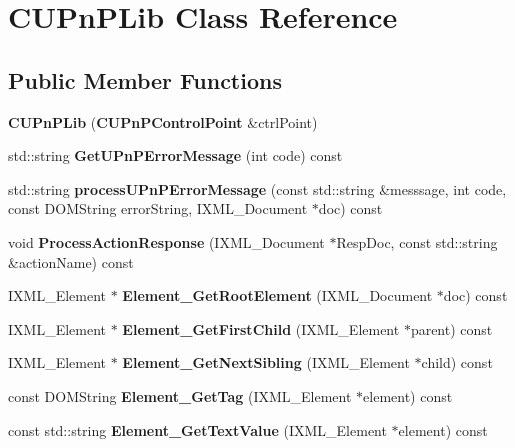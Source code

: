 \section{CUPnPLib Class Reference}
\label{classCUPnPLib}
\subsection*{Public Member Functions}
\begin{DoxyCompactItemize}
\item 
{\bfseries CUPnPLib} ({\bf CUPnPControlPoint} \&ctrlPoint)\label{classCUPnPLib_ae8731a033bfd07fde49535aad93a416f}

\item 
std::string {\bfseries GetUPnPErrorMessage} (int code) const \label{classCUPnPLib_a8d4ed7e4b65386f0cc9bb4f51164b68b}

\item 
std::string {\bfseries processUPnPErrorMessage} (const std::string \&messsage, int code, const DOMString errorString, IXML\_\-Document $\ast$doc) const \label{classCUPnPLib_a397a911f4fbdbf6155172938c4471d78}

\item 
void {\bfseries ProcessActionResponse} (IXML\_\-Document $\ast$RespDoc, const std::string \&actionName) const \label{classCUPnPLib_ad24e6d2abc21a5c380d834df67bb14ec}

\item 
IXML\_\-Element $\ast$ {\bfseries Element\_\-GetRootElement} (IXML\_\-Document $\ast$doc) const \label{classCUPnPLib_a6dd984ae2ef74898167311fbddf3afd6}

\item 
IXML\_\-Element $\ast$ {\bfseries Element\_\-GetFirstChild} (IXML\_\-Element $\ast$parent) const \label{classCUPnPLib_a23144e605ed9e30e6088dd6e6a136380}

\item 
IXML\_\-Element $\ast$ {\bfseries Element\_\-GetNextSibling} (IXML\_\-Element $\ast$child) const \label{classCUPnPLib_ace2f6d65ea1b7507d51997dc00060553}

\item 
const DOMString {\bfseries Element\_\-GetTag} (IXML\_\-Element $\ast$element) const \label{classCUPnPLib_a288317cf9fa0ad8fe882e5ebab28c2bc}

\item 
const std::string {\bfseries Element\_\-GetTextValue} (IXML\_\-Element $\ast$element) const \label{classCUPnPLib_af375d3b5038cfd9b430d1888b2f182cf}


\end{DoxyCompactItemize}
